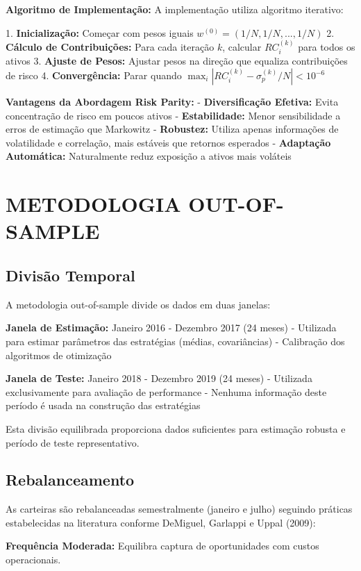 \textbf{Algoritmo de Implementação:} A implementação utiliza algoritmo iterativo:

1. \textbf{Inicialização:} Começar com pesos iguais $w^{(0)} = (1/N, 1/N, ..., 1/N)$
2. \textbf{Cálculo de Contribuições:} Para cada iteração $k$, calcular $RC_i^{(k)}$ para todos os ativos
3. \textbf{Ajuste de Pesos:} Ajustar pesos na direção que equaliza contribuições de risco
4. \textbf{Convergência:} Parar quando $\max_i |RC_i^{(k)} - \sigma_p^{(k)}/N| < 10^{-6}$

\textbf{Vantagens da Abordagem Risk Parity:}
- \textbf{Diversificação Efetiva:} Evita concentração de risco em poucos ativos
- \textbf{Estabilidade:} Menor sensibilidade a erros de estimação que Markowitz
- \textbf{Robustez:} Utiliza apenas informações de volatilidade e correlação, mais estáveis que retornos esperados
- \textbf{Adaptação Automática:} Naturalmente reduz exposição a ativos mais voláteis

\section{METODOLOGIA OUT-OF-SAMPLE}

\subsection{Divisão Temporal}

A metodologia out-of-sample divide os dados em duas janelas:

\textbf{Janela de Estimação:} Janeiro 2016 - Dezembro 2017 (24 meses)
- Utilizada para estimar parâmetros das estratégias (médias, covariâncias)
- Calibração dos algoritmos de otimização

\textbf{Janela de Teste:} Janeiro 2018 - Dezembro 2019 (24 meses)  
- Utilizada exclusivamente para avaliação de performance
- Nenhuma informação deste período é usada na construção das estratégias

Esta divisão equilibrada proporciona dados suficientes para estimação robusta e período de teste representativo.

\subsection{Rebalanceamento}

As carteiras são rebalanceadas semestralmente (janeiro e julho) seguindo práticas estabelecidas na literatura conforme DeMiguel, Garlappi e Uppal (2009):

\textbf{Frequência Moderada:} Equilibra captura de oportunidades com custos operacionais.

